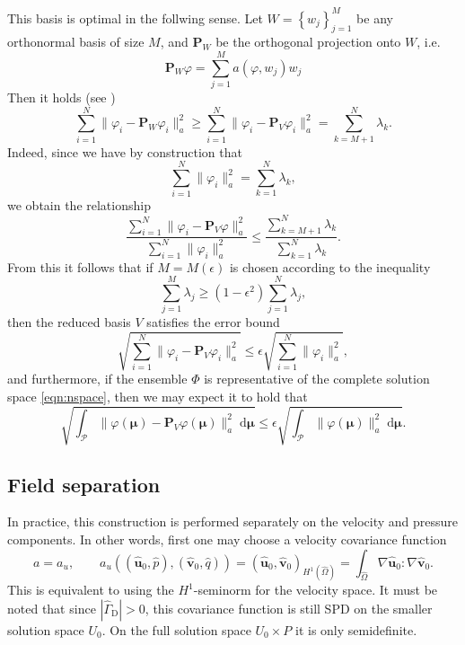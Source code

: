 \documentclass[onecolumn, twoside, a4paper, 11pt]{article}
\newcommand{\dd}{{\;\mathrm{d}}}
\begin{document}
This basis is optimal in the follwing sense. Let
$W = \left\{ w_j \right\}_{j=1}^M$ be any orthonormal basis of size $M$, and
$\bm P_W$ be the orthogonal projection onto $W$, i.e.
\begin{equation}
  \bm P_W \varphi = \sum_{j=1}^M a(\varphi, w_j) w_j
\end{equation}
Then it holds (see \cite[Proposition 6.2]{Quarteroni2016rbm})
\begin{equation}
  \sum_{i=1}^N \| \varphi_i - \bm P_W \varphi_i \|_a^2 \geq
  \sum_{i=1}^N \| \varphi_i - \bm P_V \varphi_i \|_a^2 =
  \sum_{k=M+1}^N \lambda_k.
\end{equation}
Indeed, since we have by construction that
\begin{equation}
  \sum_{i=1}^N \| \varphi_i \|_a^2 = \sum_{k=1}^N \lambda_k,
\end{equation}
we obtain the relationship
\begin{equation}
  \frac{ \sum_{i=1}^N \| \varphi_i - \bm P_V \varphi \|_a^2 }{ \sum_{i=1}^N \| \varphi_i \|_a^2 }
  \leq \frac{ \sum_{k=M+1}^N \lambda_k }{ \sum_{k=1}^N \lambda_k }.
\end{equation}
From this it follows that if $M = M(\epsilon)$ is chosen according to the inequality
\begin{equation}
  \label{eqn:error}
  \sum_{j=1}^M \lambda_j
  \geq \left(1 - \epsilon^2\right) \sum_{j=1}^N \lambda_j,
\end{equation}
then the reduced basis $V$ satisfies the error bound
\begin{equation}
  \sqrt{ \sum_{i=1}^N \| \varphi_i - \bm P_V \varphi_i \|_a^2 }
  \leq \epsilon \sqrt{ \sum_{i=1}^N \| \varphi_i \|_a^2 },
\end{equation}
and furthermore, if the ensemble $\Phi$ is representative of the complete
solution space \eqref{eqn:nspace}, then we may expect it to hold that
\begin{equation}
  \sqrt{ \int_\mathcal{P} \| \varphi(\bm \mu) - \bm P_V \varphi(\bm \mu) \|_a^2 \dd\bm \mu }
  \leq \epsilon \sqrt{ \int_\mathcal{P} \| \varphi(\bm \mu) \|_a^2 \dd\bm \mu }.
\end{equation}

\subsection{Field separation}

In practice, this construction is performed separately on the velocity and
pressure components. In other words, first one may choose a velocity covariance
function
\begin{equation}
  a = a_u, \qquad a_u((\hat{\bm u}_0, \hat{p}), (\hat{\bm v}_0, \hat{q})) =
  \left( \hat{\bm u}_0, \hat{\bm v}_0 \right)_{H^1(\hat{\Omega})}
  = \int_{\hat{\Omega}} \nabla \hat{\bm u}_0 : \nabla \hat{\bm v}_0.
\end{equation}
This is equivalent to using the $H^1$-seminorm for the velocity space. It must
be noted that since $|\hat{\Gamma}_\text{D}| > 0$, this covariance function is
still SPD on the smaller solution space $U_0$. On the full solution space
$U_0 \times P$ it is only semidefinite.
\end{document}
